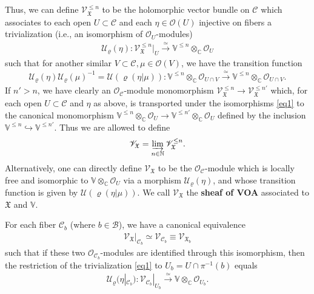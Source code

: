 \documentclass[12pt,a4paper,notitlepage]{article}
\theoremstyle{definition}
\theoremstyle{plain}
\newcommand{\fk}{\mathfrak}
\newcommand{\mc}{\mathcal}
\newcommand{\scr}{\mathscr}
\newcommand{\Vbb}{\mathbb V}
\newcommand{\Cbb}{\mathbb C}
\newcommand{\Nbb}{\mathbb N}
\numberwithin{equation}{section}
\begin{document}
Thus, we can define $\scr V_{\fk X}^{\leq n}$ \index{V@$\scr V_{\fk X}^{\leq n},\scr V_{\fk X}$} to be the holomorphic vector bundle on $\mc C$ which associates to each open $U\subset\mc C$ and each $\eta\in\scr O(U)$ injective on fibers a trivialization (i.e., an isomorphism of $\scr O_U$-modules) \index{U@$\mc U_\varrho(\eta)$}
\begin{align}
\mc U_\varrho(\eta):\scr V_{\fk X}^{\leq n}|_U\xrightarrow{\simeq}\Vbb^{\leq n}\otimes_\Cbb\scr O_U	\label{eq1}
\end{align}
such that for another similar $V\subset\mc C,\mu\in\scr O(V)$, we have the transition function
\begin{align}
\mc U_\varrho(\eta)\mc U_\varrho(\mu)^{-1}=\mc U(\varrho(\eta|\mu)):\Vbb^{\leq n}\otimes_\Cbb\scr O_{U\cap V}\xrightarrow{\simeq}\Vbb^{\leq n}\otimes_\Cbb\scr O_{U\cap V}. \label{eq12}
\end{align} 
If $n'>n$, we have clearly an  $\scr O_{\mc C}$-module monomorphism $\scr V_{\fk X}^{\leq n}\rightarrow\scr V_{\fk X}^{\leq n'}$ which, for each open $U\subset\mc C$ and $\eta$ as above, is transported under the isomorphisms \eqref{eq1} to the canonical monomorphism $\Vbb^{\leq n}\otimes_\Cbb\scr O_U\rightarrow\Vbb^{\leq n'}\otimes_\Cbb\scr O_U$ defined by the inclusion $\Vbb^{\leq n}\hookrightarrow\Vbb^{\leq n'}$. Thus we are allowed to define
\begin{align*}
\scr V_{\fk X}=\varinjlim_{n\in\Nbb}\scr V_{\fk X}^{\leq n}.
\end{align*}
Alternatively, one can directly define $\scr V_{\fk X}$ to be the $\scr O_{\mc C}$-module which is locally free and isomorphic to $\Vbb\otimes_\Cbb\scr O_U$ via a morphism $\mc U_\varrho(\eta)$, and whose transition function is given by $\mc U(\varrho(\eta|\mu))$. We call $\scr V_{\fk X}$ the \textbf{sheaf of VOA} associated to $\fk X$ and $\Vbb$.

For each fiber $\mc C_b$ (where $b\in\mc B$), we have a canonical equivalence
\begin{align}
\scr V_{\fk X}|_{\mc C_b}\simeq\scr V_{\mc C_b}\equiv\scr V_{\fk X_b}\label{eq15}
\end{align}
such that if these two $\scr O_{\mc C_b}$-modules are identified through this isomorphism, then  the restriction of the trivialization \eqref{eq1} to $U_b=U\cap\pi^{-1}(b)$ equals
\begin{align*}
\mc U_\varrho(\eta|_{\mc C_b}):\scr V_{\mc C_b}|_{U_b}\xrightarrow{\simeq}\Vbb\otimes_\Cbb\scr O_{U_b}.
\end{align*}
\end{document}
